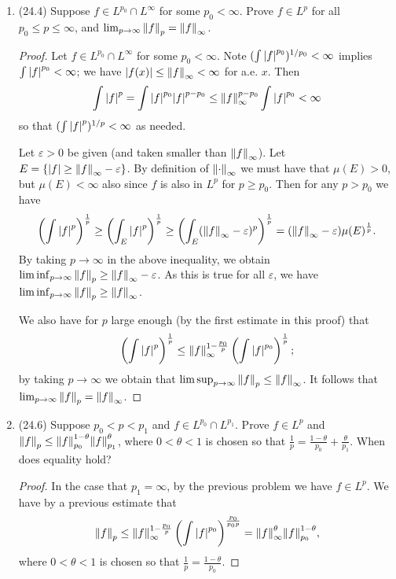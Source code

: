 \documentclass[11pt]{article}
\newcommand{\br}[1]{\left(#1\right)}
\newcommand{\cbr}[1]{\left\{#1\right\}}
\begin{document}
\begin{enumerate}
    \item (24.4) Suppose $f\in L^{p_0}\cap L^\infty$ for some $p_0<\infty$. Prove $f\in L^p$ for all $p_0\leq p\leq \infty$, and $\lim_{p\to\infty}\norm{f}_p = \norm{f}_\infty$. \begin{proof}
      Let $f\in L^{p_0}\cap L^\infty$ for some $p_0<\infty$. Note $(\int\abs{f}^{p_0})^{1/p_0}<\infty$ implies $\int\abs{f}^{p_0}<\infty$; we have $\abs{f(x)}\leq \norm{f}_\infty< \infty$ for a.e. $x$. Then \[\int \abs{f}^p = \int\abs{f}^{p_0}\abs{f}^{p-p_0}\leq \norm{f}_{\infty}^{p-p_0}\int \abs{f}^{p_0} <\infty\] so that $(\int \abs{f}^p)^{1/p}<\infty$ as needed.

      Let $\varepsilon>0$ be given (and taken smaller than $\norm{f}_\infty$). Let $E = \cbr{\abs{f}\geq \norm{f}_\infty - \varepsilon}$. By definition of $\norm{\cdot}_\infty$ we must have that $\mu(E)>0$, but $\mu(E)<\infty$ also since $f$ is also in $L^p$ for $p\geq p_0$. Then for any $p>p_0$ we have \[\br{\int\abs{f}^p}^{\frac{1}{p}}\geq \br{\int_E\abs{f}^p}^{\frac{1}{p}}\geq \br{\int_E(\norm{f}_\infty-\varepsilon)^p}^{\frac{1}{p}} = (\norm{f}_\infty-\varepsilon)\mu(E)^{\frac{1}{p}}.\] By taking $p\to\infty$ in the above inequality, we obtain $\liminf_{p\to\infty} \norm{f}_p \geq \norm{f}_\infty-\varepsilon$. As this is true for all $\varepsilon$, we have $\liminf_{p\to\infty} \norm{f}_p \geq \norm{f}_\infty$.

      We also have for $p$ large enough (by the first estimate in this proof) that \[\br{\int \abs{f}^p}^{\frac{1}{p}} \leq \norm{f}_{\infty}^{1-\frac{p_0}{p}}\br{\int \abs{f}^{p_0}}^{\frac{1}{p}};\] by taking $p\to\infty$ we obtain that $\limsup_{p\to\infty}\norm{f}_p \leq \norm{f}_{\infty}$. It follows that $\lim_{p\to\infty}\norm{f}_p = \norm{f}_\infty$.
    \end{proof}
    \item (24.6) Suppose $p_0<p<p_1$ and $f\in L^{p_0}\cap L^{p_1}$. Prove $f\in L^p$ and $\norm{f}_p\leq \norm{f}_{p_0}^{1-\theta}\norm{f}_{p_1}^\theta$, where $0<\theta<1$ is chosen so that $\frac{1}{p} = \frac{1-\theta}{p_0}+\frac{\theta}{p_1}$. When does equality hold? \begin{proof}
      In the case that $p_1=\infty$, by the previous problem we have $f\in L^p$. We have by a previous estimate that \[\norm{f}_p\leq \norm{f}_{\infty}^{1-\frac{p_0}{p}}\br{\int \abs{f}^{p_0}}^{\frac{p_0}{p_0p}} = \norm{f}_\infty^\theta\norm{f}_{p_0}^{1-\theta},\] where $0<\theta<1$ is chosen so that $\frac{1}{p} = \frac{1-\theta}{p_0}$.


\end{proof}
\end{enumerate}
\end{document}
